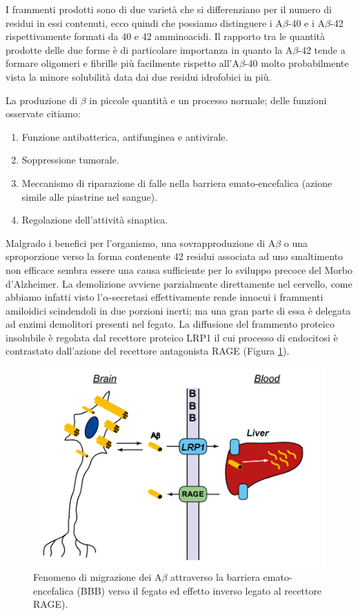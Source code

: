 \documentclass[a4paper, 12pt]{article}
\begin{document}
I frammenti prodotti sono di due varietà che si differenziano per il numero di residui in essi contenuti, ecco quindi che possiamo distinguere i A$\beta$-40 e i A$\beta$-42 rispettivamente formati da 40 e 42 amminoacidi. Il rapporto tra le quantità prodotte delle due forme è di particolare importanza in quanto la A$\beta$-42 tende a formare oligomeri e fibrille più facilmente rispetto all’A$\beta$-40 molto probabilmente vista la minore solubilità data dai due residui idrofobici in più.\cite{kepp_bioinorganic_2012, irvine_protein_2008}

La produzione di $\beta$ in piccole quantità e un processo normale; delle funzioni osservate citiamo: \cite{brothers_physiological_2018}

\begin{enumerate}
	\item Funzione antibatterica, antifunginea e antivirale.
	\item Soppressione tumorale.
	\item Meccanismo di riparazione di falle nella barriera emato-encefalica (azione simile alle piastrine nel sangue).
	\item Regolazione dell'attività sinaptica.
\end{enumerate}

Malgrado i benefici per l'organismo, una sovrapproduzione di A$\beta$ o una sproporzione verso la forma contenente 42 residui associata ad uno smaltimento non efficace sembra essere una causa sufficiente per lo sviluppo precoce del Morbo d’Alzheimer. \cite{irvine_protein_2008}
La demolizione avviene parzialmente direttamente nel cervello, come abbiamo infatti visto l'$\alpha$-secretasi effettivamente rende innocui i frammenti amiloidici scindendoli in due porzioni inerti; ma una gran parte di essa è delegata ad enzimi demolitori presenti nel fegato. La diffusione del frammento proteico insolubile è regolata dal recettore proteico LRP1 il cui processo di endocitosi è contrastato dall'azione del recettore antagonista RAGE (Figura \ref{fig:bbb}).\cite{lillis_beyond_2005, dries_extracting_2012}

\begin{figure}[H]
	\centering
	\includegraphics[width=.8\linewidth]{immagini/bbb.png}
	\caption{Fenomeno di migrazione dei A$\beta$ attraverso la barriera emato-encefalica (BBB) verso il fegato ed effetto inverso legato al recettore RAGE).}
	\label{fig:bbb}
\end{figure}
\end{document}
